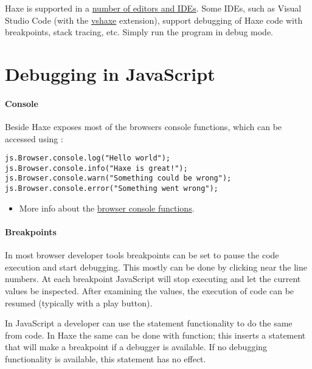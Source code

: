 Haxe is supported in a \href{https://haxe.org/documentation/introduction/editors-and-ides.html}{number of editors and IDEs}. Some IDEs, such as Visual Studio Code (with the \href{https://github.com/vshaxe/vshaxe/wiki/Debugging}{vshaxe} extension), support debugging of Haxe code with breakpoints, stack tracing, etc. Simply run the program in debug mode.


\section{Debugging in JavaScript}
\label{debugging-javascript}

\paragraph{Console}

Beside  Haxe exposes most of the browsers console functions, which can be accessed using \href{http://api.haxe.org/v/dev/js/html/Console.html}{}:

\begin{lstlisting}
js.Browser.console.log("Hello world"); 
js.Browser.console.info("Haxe is great!"); 
js.Browser.console.warn("Something could be wrong"); 
js.Browser.console.error("Something went wrong"); 
\end{lstlisting}


\begin{itemize}
	\item More info about the \href{https://developer.mozilla.org/en-US/docs/Web/API/Console}{browser console functions}.
\end{itemize}

\paragraph{Breakpoints}

In most browser developer tools breakpoints can be set to pause the code execution and start debugging. This mostly can be done by clicking near the line numbers. At each breakpoint JavaScript will stop executing and let the current values be inspected. After examining the values, the execution of code can be resumed (typically with a play button).

In JavaScript a developer can use the  statement functionality to do the same from code.
In Haxe the same can be done with \href{http://api.haxe.org/v/js/Lib.html#debug}{} function; this inserts a  statement that will make a breakpoint if a debugger is available. If no debugging functionality is available, this statement has no effect. 

